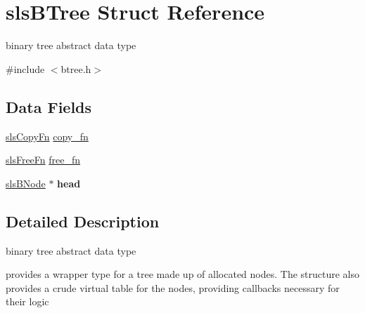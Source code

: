 \hypertarget{structsls_b_tree}{\section{sls\+B\+Tree Struct Reference}
\label{structsls_b_tree}
}


binary tree abstract data type  




{\ttfamily \#include $<$btree.\+h$>$}

\subsection*{Data Fields}
\begin{DoxyCompactItemize}
\item 
\hyperlink{btree_8h_a47ae84e7a836a555e08b23becda28540}{sls\+Copy\+Fn} \hyperlink{structsls_b_tree_a6fc84cddafbd7b9d9ac73471b2174833}{copy\+\_\+fn}
\item 
\hyperlink{btree_8h_a6a4f6dc2b5a465792a8587270a801923}{sls\+Free\+Fn} \hyperlink{structsls_b_tree_a184ef530c5a5ae70db3d96c236ef4030}{free\+\_\+fn}
\item 
\hypertarget{structsls_b_tree_a90be0b44ae4d467d061db36ef77e160c}{\hyperlink{structsls_b_node}{sls\+B\+Node} $\ast$ {\bfseries head}}\label{structsls_b_tree_a90be0b44ae4d467d061db36ef77e160c}

\end{DoxyCompactItemize}


\subsection{Detailed Description}
binary tree abstract data type 

provides a wrapper type for a tree made up of allocated nodes. The structure also provides a crude virtual table for the nodes, providing callbacks necessary for their logic 

